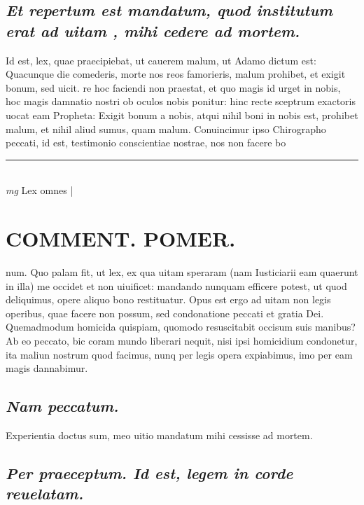 \documentclass{article}
\begin{document}
\begin{pages}
\subsection*{\textit{Et repertum est mandatum, quod institutum erat ad uitam , mihi cedere ad mortem. }}\pstart Id est, lex, quae praecipiebat, ut cauerem malum, ut Adamo dictum est: Quacunque die comederis, morte nos reos famorieris, malum prohibet, et exigit bonum, sed uicit.  re hoc faciendi non praestat, et quo magis id urget in nobis, hoc magis damnatio nostri ob oculos nobis ponitur: hinc recte sceptrum exactoris uocat eam Propheta: Exigit bonum a nobis, atqui nihil boni in nobis est, prohibet malum, et nihil aliud sumus, quam malum. Conuincimur ipso Chirographo peccati, id est, testimonio conscientiae nostrae, nos non facere bo  \pend
\vspace{0.5cm}\noindent
\vspace{0.2cm}\rule{1cm}{0.2pt}\\ 
\hspace{0.2cm}\textit{mg}
\footnotesize Lex omnes 
\normalsize| 
\section*{COMMENT. POMER.  }\pstart num. Quo palam fit, ut lex, ex qua uitam speraram (nam Iusticiarii eam quaerunt in illa) me occidet et non uiuificet: mandando nunquam efficere potest, ut quod deliquimus, opere aliquo bono restituatur.  Opus est ergo ad uitam non legis operibus, quae facere non possum, sed condonatione peccati et gratia Dei. Quemadmodum homicida quispiam, quomodo resuscitabit occisum suis manibus? Ab eo peccato, bic coram mundo liberari nequit, nisi ipsi homicidium condonetur, ita maliun nostrum quod facimus, nunq per legis opera expiabimus, imo per eam magis dannabimur.   \pend
{}
{}
\subsection*{\textit{Nam peccatum. }}\pstart Experientia doctus sum, meo uitio mandatum mihi cessisse ad mortem.   \pend
{}
{}
\subsection*{\textit{Per praeceptum. Id est, legem in corde reuelatam.  }}
{}

\end{pages}
\end{document}

